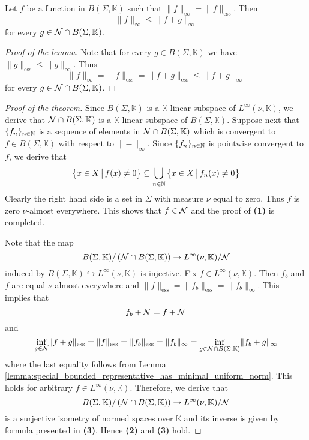 \begin{lemma}\label{lemma:special_bounded_representative_has_minimal_uniform_norm}
    Let $f$ be a function in $B(\Sigma, \mathbb{K})$ such that $\lVert f \rVert_{\infty} = \lVert f \rVert_{\mathrm{ess}}$. Then
    $$\lVert f \rVert_{\infty} \leq \lVert f + g \rVert_{\infty}$$
    for every $g \in {\mathcal N} \cap B(\Sigma, \mathbb{K})$.
\end{lemma}
\begin{proof}[Proof of the lemma]
    Note that for every $g \in B(\Sigma, \mathbb{K})$ we have $\lVert g \rVert_{\mathrm{ess}} \leq \lVert g \rVert_{\infty}$. Thus
    $$\lVert f \rVert_{\infty} = \lVert f \rVert_{\mathrm{ess}} = \lVert f + g \rVert_{\mathrm{ess}} \leq \lVert f + g \rVert_{\infty}$$
    for every $g \in {\mathcal N} \cap B(\Sigma, \mathbb{K})$.
\end{proof}

\begin{proof}[Proof of the theorem]
    Since $B(\Sigma,\mathbb{K})$ is a $\mathbb{K}$-linear subspace of $L^{\infty}(\nu,\mathbb{K})$, we derive that ${\mathcal N}\cap B(\Sigma, \mathbb{K})$ is a $\mathbb{K}$-linear subspace of $B(\Sigma,\mathbb{K})$. Suppose next that $\{f_n\}_{n \in {\mathbb N}}$ is a sequence of elements in ${\mathcal N}\cap B(\Sigma,\mathbb{K})$ which is convergent to $f \in B(\Sigma,\mathbb{K})$ with respect to $\lVert - \rVert_{\infty}$. Since $\{f_n\}_{n\in {\mathbb N}}$ is pointwise convergent to $f$, we derive that
    $$\big\{x\in X\,\big|\,f(x) \neq 0\big\} \subseteq \bigcup_{n\in {\mathbb N}}\big\{x\in X\,\big|\,f_n(x) \neq 0\big\}$$
    Clearly the right hand side is a set in $\Sigma$ with measure $\nu$ equal to zero. Thus $f$ is zero $\nu$-almost everywhere. This shows that $f \in {\mathcal N}$ and the proof of \textbf{(1)} is completed.

    Note that the map
    $$B(\Sigma,\mathbb{K})/\left({\mathcal N}\cap B(\Sigma,\mathbb{K})\right) \rightarrow L^{\infty}(\nu,\mathbb{K})/{\mathcal N}$$
    induced by $B(\Sigma, \mathbb{K})\hookrightarrow L^{\infty}(\nu,\mathbb{K})$ is injective. Fix $f \in L^{\infty}(\nu,\mathbb{K})$. Then $f_b$ and $f$ are equal $\nu$-almost everywhere and $\lVert f \rVert_{\mathrm{ess}} = \lVert f_b\rVert_{\mathrm{ess}} = \lVert f_b \rVert_{\infty}$. This implies that
    $$f_b + {\mathcal N} = f + {\mathcal N}$$
    and
    $$\inf_{g \in {\mathcal N}} \lVert f + g \rVert_{\mathrm{ess}} = \lVert f \rVert_{\mathrm{ess}} = \lVert f_b \rVert_{\mathrm{ess}} = \lVert f_b \rVert_{\infty} =  \inf_{g \in {\mathcal N} \cap B(\Sigma, \mathbb{K})}\lVert f_b + g\rVert_{\infty}$$
    where the last equality follows from Lemma \ref{lemma:special_bounded_representative_has_minimal_uniform_norm}. This holds for arbitrary $f \in L^{\infty}(\nu,\mathbb{K})$. Therefore, we derive that
    $$B(\Sigma,\mathbb{K})/\left({\mathcal N}\cap B(\Sigma,\mathbb{K})\right) \rightarrow L^{\infty}(\nu,\mathbb{K})/{\mathcal N}$$
    is a surjective isometry of normed spaces over $\mathbb{K}$ and its inverse is given by formula presented in \textbf{(3)}. Hence \textbf{(2)} and \textbf{(3)} hold.
\end{proof}

